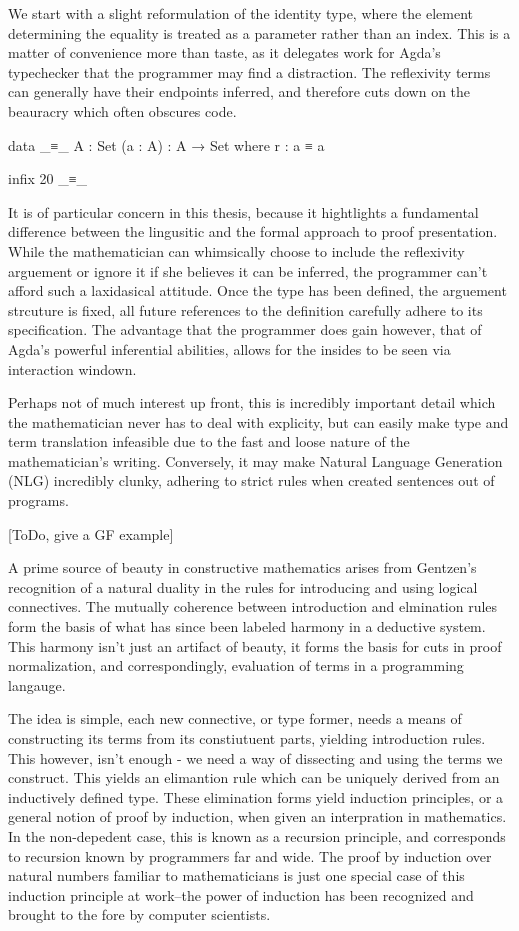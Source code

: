\documentclass[11pt, a4paper]{article}
\begin{document}
We start with a slight reformulation of the identity type, where the element
determining the equality is treated as a parameter rather than an index. This is
a matter of convenience more than taste, as it delegates work for Agda's
typechecker that the programmer may find a distraction. The reflexivity terms
can generally have their endpoints inferred, and therefore cuts down on the
beauracry which often obscures code.

\begin{code}

  data _≡_ {A : Set} (a : A) : A → Set where r : a ≡ a

  infix 20 _≡_

\end{code}

It is of particular concern in this thesis, because it hightlights a fundamental
difference between the lingusitic and the formal approach to proof presentation.
While the mathematician can whimsically choose to include the reflexivity
arguement or ignore it if she believes it can be inferred, the programmer can't
afford such a laxidasical attitude. Once the type has been defined, the
arguement strcuture is fixed, all future references to the definition carefully
adhere to its specification. The advantage that the programmer does gain
however, that of Agda's powerful inferential abilities, allows for the insides
to be seen via interaction windown.

Perhaps not of much interest up front, this is incredibly important detail which
the mathematician never has to deal with explicity, but can easily make type and
term translation infeasible due to the fast and loose nature of the
mathematician's writing. Conversely, it may make Natural Language Generation
(NLG) incredibly clunky, adhering to strict rules when created sentences out of
programs.

[ToDo, give a GF example]

A prime source of beauty in constructive mathematics arises from Gentzen's
recognition of a natural duality in the rules for introducing and using logical
connectives. The mutually coherence between introduction and elmination rules
form the basis of what has since been labeled harmony in a deductive system.
This harmony isn't just an artifact of beauty, it forms the basis for cuts in
proof normalization, and correspondingly, evaluation of terms in a programming
langauge.

The idea is simple, each new connective, or type former, needs a means of
constructing its terms from its constiutuent parts, yielding introduction rules.
This however, isn't enough - we need a way of dissecting and using the terms we
construct. This yields an elimantion rule which can be uniquely derived from an
inductively defined type. These elimination forms yield induction principles, or
a general notion of proof by induction, when given an interpration in
mathematics. In the non-depedent case, this is known as a recursion principle,
and corresponds to recursion known by programmers far and wide. The proof by
induction over natural numbers familiar to mathematicians is just one special
case of this induction principle at work--the power of induction has been
recognized and brought to the fore by computer scientists.
\end{document}
